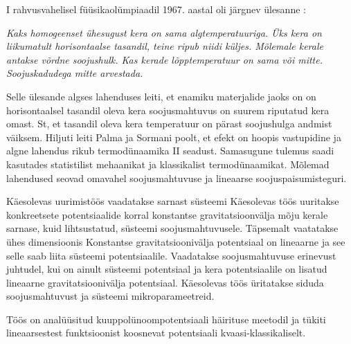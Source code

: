 \documentclass{trkut}%
\begin{document}
\maketitle%
\tableofcontents%
\nummerdame%
I rahvusvahelisel füüsikaolümpiaadil 1967. aastal oli järgnev ülesanne \parencite[6]{ipho67}:

\textit{Kaks homogeenset ühesugust kera on sama algtemperatuuriga. Üks kera on liikumatult horisontaalse tasandil, teine ripub niidi küljes. Mõlemale kerale antakse võrdne soojushulk. Kas kerade lõpptemperatuur on sama või mitte. Soojuskadudega mitte arvestada.}

Selle ülesande algses lahenduses leiti, et enamiku materjalide jaoks on on horisontaalsel tasandil oleva kera soojusmahtuvus on suurem riputatud kera omast.
St, et tasandil oleva kera temperatuur on pärast soojushulga andmist väiksem.
Hiljuti leiti Palma ja Sormani poolt, et efekt on hoopis vastupidine ja algne lahendus rikub termodünaamika II seadust.
Samasugune tulemus saadi kasutades statistilist mehaanikat ja klassikalist termodünaamikat.
Mõlemad lahendused seovad omavahel soojusmahtuvuse ja lineaarse soojuspaisumisteguri.

Käesolevas uurimistöös vaadatakse sarnast süsteemi
Käesolevas töös uuritakse konkreetsete potentsiaalide korral konstantse gravitatsioonvälja mõju kerale sarnase, kuid lihtsustatud, süsteemi soojusmahtuvusele.
Täpsemalt vaatatakse ühes dimensioonis
Konstantse gravitatsioonivälja potentsiaal on lineaarne ja see selle saab liita süsteemi potentsiaalile.
Vaadatakse soojusmahtuvuse erinevust juhtudel, kui on ainult süsteemi potentsiaal ja kera potentsiaalile on lisatud lineaarne gravitatsioonivälja potentsiaal.
Käesolevas töös üritatakse siduda soojusmahtuvust ja süsteemi mikroparameetreid.

Töös on analüüsitud kuuppolünoompotentsiaali häirituse meetodil ja tükiti lineaarsestest funktsioonist koosnevat potentsiaali kvaasi-klassikaliselt.

\end{document}
